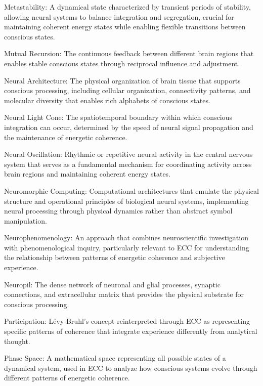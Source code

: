 Metastability: A dynamical state characterized by transient periods of stability, allowing neural systems to balance integration and segregation, crucial for maintaining coherent energy states while enabling flexible transitions between conscious states.

Mutual Recursion: The continuous feedback between different brain regions that enables stable conscious states through reciprocal influence and adjustment.

Neural Architecture: The physical organization of brain tissue that supports conscious processing, including cellular organization, connectivity patterns, and molecular diversity that enables rich alphabets of conscious states.

Neural Light Cone: The spatiotemporal boundary within which conscious integration can occur, determined by the speed of neural signal propagation and the maintenance of energetic coherence.

Neural Oscillation: Rhythmic or repetitive neural activity in the central nervous system that serves as a fundamental mechanism for coordinating activity across brain regions and maintaining coherent energy states.

Neuromorphic Computing: Computational architectures that emulate the physical structure and operational principles of biological neural systems, implementing neural processing through physical dynamics rather than abstract symbol manipulation.

Neurophenomenology: An approach that combines neuroscientific investigation with phenomenological inquiry, particularly relevant to ECC for understanding the relationship between patterns of energetic coherence and subjective experience.

Neuropil: The dense network of neuronal and glial processes, synaptic connections, and extracellular matrix that provides the physical substrate for conscious processing.

Participation: Lévy-Bruhl's concept reinterpreted through ECC as representing specific patterns of coherence that integrate experience differently from analytical thought.

Phase Space: A mathematical space representing all possible states of a dynamical system, used in ECC to analyze how conscious systems evolve through different patterns of energetic coherence.


